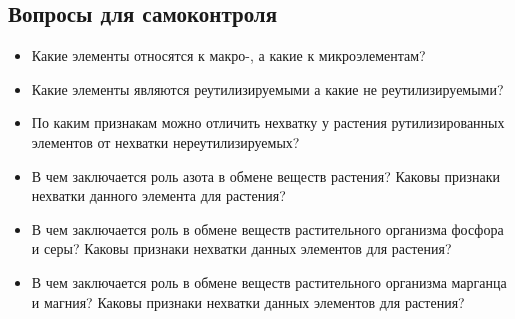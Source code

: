 	\subsection*{Вопросы для самоконтроля}
	
	\begin{itemize}
		
		\item Какие элементы относятся к макро-, а какие к микроэлементам?
		\item Какие элементы являются реутилизируемыми а какие не реутилизируемыми? 
		\item По каким признакам можно отличить нехватку у растения рутилизированных элементов от нехватки нереутилизируемых?
		\item В чем заключается роль \hypertarget{nitrogen}{азота} в обмене веществ растения? Каковы признаки нехватки данного элемента для растения?
		\item В чем заключается роль в обмене веществ растительного организма \hypertarget{PS}{фосфора и серы}? Каковы признаки нехватки данных элементов для растения?
		\item В чем заключается роль в обмене веществ растительного организма \hypertarget{MnMg}{марганца и магния}? Каковы признаки нехватки данных элементов для растения?
	\end{itemize}